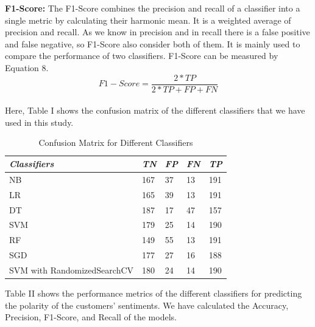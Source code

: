 \documentclass[conference]{IEEEtran}
\begin{document}
\vspace{0.5cm}
\textbf{F1-Score:} The F1-Score combines the precision and recall of a classifier into a single metric by calculating their harmonic mean. It is a weighted average of precision and recall. As we know in precision and in recall there is a false positive and false negative, so F1-Score also consider both of them. It is mainly used to compare the performance of two classifiers. F1-Score can be measured by Equation 8.
\begin{equation}
  F1-Score = \frac{2*TP}{2*TP+FP+FN}
\end{equation}
\\
Here, Table I shows the confusion matrix of the different classifiers that we have used in this study.

\begin{table}[h]
\caption{Confusion Matrix for Different Classifiers}
\setlength{\tabcolsep}{8pt} %
\renewcommand{\arraystretch}{1.5} %
\begin{tabular}{|l|l|l|l|l|}
\hline

\textit{\textbf{Classifiers}} & \textit{\textbf{TN}} & \textit{\textbf{FP}} & \textit{\textbf{FN}} & \textit{\textbf{TP}} \\ \hline
NB & 167 & 37 & 13 & 191 \\ \hline
LR & 165 & 39 & 13 & 191 \\ \hline
DT       & 187 & 17  & 47 & 157 \\ \hline
SVM                 & 179 & 25  & 14 & 190 \\ \hline
RF       & 149 & 55  & 13 & 191 \\ \hline
SGD                 & 177 & 27  & 16 & 188 \\ \hline
SVM with RandomizedSearchCV                 & 180 & 24  & 14 & 190 \\ \hline

\end{tabular}

\end{table}




Table II shows the performance metrics of the different classifiers for predicting the polarity of the customers' sentiments. We have calculated the Accuracy, Precision, F1-Score, and Recall of the models.
\end{document}
